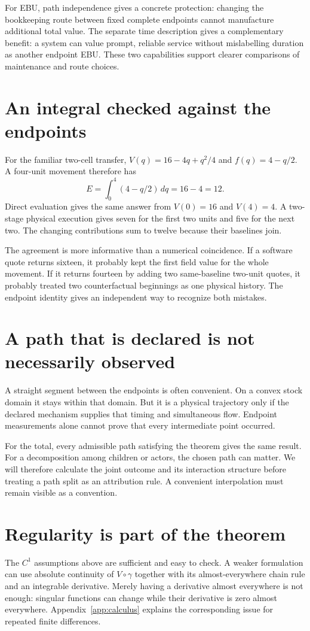 For EBU, path independence gives a concrete protection: changing the bookkeeping route between fixed complete endpoints cannot manufacture additional total value. The separate time description gives a complementary benefit: a system can value prompt, reliable service without mislabelling duration as another endpoint EBU. These two capabilities support clearer comparisons of maintenance and route choices.

\section{An integral checked against the endpoints}
For the familiar two-cell transfer, $V(q)=16-4q+q^2/4$ and $f(q)=4-q/2$. A four-unit movement therefore has
\begin{equation}
 E=\int_0^4(4-q/2)\,dq=16-4=12.
\end{equation}
Direct evaluation gives the same answer from $V(0)=16$ and $V(4)=4$. A two-stage physical execution gives seven for the first two units and five for the next two. The changing contributions sum to twelve because their baselines join.

The agreement is more informative than a numerical coincidence. If a software quote returns sixteen, it probably kept the first field value for the whole movement. If it returns fourteen by adding two same-baseline two-unit quotes, it probably treated two counterfactual beginnings as one physical history. The endpoint identity gives an independent way to recognize both mistakes.

\section{A path that is declared is not necessarily observed}
A straight segment between the endpoints is often convenient. On a convex stock domain it stays within that domain. But it is a physical trajectory only if the declared mechanism supplies that timing and simultaneous flow. Endpoint measurements alone cannot prove that every intermediate point occurred.

For the total, every admissible path satisfying the theorem gives the same result. For a decomposition among children or actors, the chosen path can matter. We will therefore calculate the joint outcome and its interaction structure before treating a path split as an attribution rule. A convenient interpolation must remain visible as a convention.

\section{Regularity is part of the theorem}
The $C^1$ assumptions above are sufficient and easy to check. A weaker formulation can use absolute continuity of $V\circ\gamma$ together with its almost-everywhere chain rule and an integrable derivative. Merely having a derivative almost everywhere is not enough: singular functions can change while their derivative is zero almost everywhere. Appendix~\ref{app:calculus} explains the corresponding issue for repeated finite differences.

